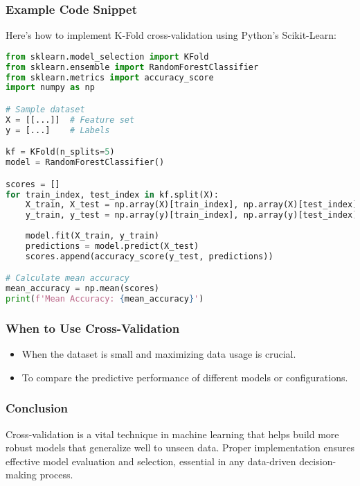 \documentclass[aspectratio=169]{beamer}
\begin{document}
\begin{frame}[fragile]
    \frametitle{Example Code Snippet}
    Here’s how to implement K-Fold cross-validation using Python’s Scikit-Learn:
    \begin{lstlisting}[language=Python]
from sklearn.model_selection import KFold
from sklearn.ensemble import RandomForestClassifier
from sklearn.metrics import accuracy_score
import numpy as np

# Sample dataset
X = [[...]]  # Feature set
y = [...]    # Labels

kf = KFold(n_splits=5)
model = RandomForestClassifier()

scores = []
for train_index, test_index in kf.split(X):
    X_train, X_test = np.array(X)[train_index], np.array(X)[test_index]
    y_train, y_test = np.array(y)[train_index], np.array(y)[test_index]
    
    model.fit(X_train, y_train)
    predictions = model.predict(X_test)
    scores.append(accuracy_score(y_test, predictions))

# Calculate mean accuracy
mean_accuracy = np.mean(scores)
print(f'Mean Accuracy: {mean_accuracy}')
    \end{lstlisting}
\end{frame}

\begin{frame}
    \frametitle{When to Use Cross-Validation}
    \begin{itemize}
        \item When the dataset is small and maximizing data usage is crucial.
        \item To compare the predictive performance of different models or configurations.
    \end{itemize}
\end{frame}

\begin{frame}
    \frametitle{Conclusion}
    Cross-validation is a vital technique in machine learning that helps build more robust models that generalize well to unseen data. Proper implementation ensures effective model evaluation and selection, essential in any data-driven decision-making process.
\end{frame}
\end{document}
